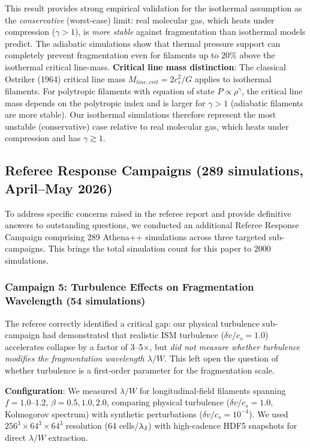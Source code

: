 \documentclass[twoside,twocolumn]{mnras}
\begin{document}
This result provides strong empirical validation for the isothermal assumption as the {\it conservative} (worst-case) limit: real molecular gas, which heats under compression ($\gamma > 1$), is {\it more stable} against fragmentation than isothermal models predict. The adiabatic simulations show that thermal pressure support can completely prevent fragmentation even for filaments up to $20\%$ above the isothermal critical line-mass. \textbf{Critical line mass distinction}: The classical Ostriker (1964) critical line mass $M_{line,crit} = 2c_s^2/G$ applies to isothermal filaments. For polytropic filaments with equation of state $P \propto \rho^\gamma$, the critical line mass depends on the polytropic index and is larger for $\gamma > 1$ (adiabatic filaments are more stable). Our isothermal simulations therefore represent the most unstable (conservative) case relative to real molecular gas, which heats under compression and has $\gamma \gtrsim 1$.

\subsection{Referee Response Campaigns (289 simulations, April--May 2026)}
\label{sec:referee_response}

To address specific concerns raised in the referee report and provide definitive answers to outstanding questions, we conducted an additional Referee Response Campaign comprising 289 Athena++ simulations across three targeted sub-campaigns. This brings the total simulation count for this paper to 2000 simulations.

\subsubsection{Campaign 5: Turbulence Effects on Fragmentation Wavelength (54 simulations)}

The referee correctly identified a critical gap: our physical turbulence sub-campaign had demonstrated that realistic ISM turbulence ($\delta v/c_s = 1.0$) accelerates collapse by a factor of 3--5$\times$, but \textit{did not measure whether turbulence modifies the fragmentation wavelength $\lambda/W$}. This left open the question of whether turbulence is a first-order parameter for the fragmentation scale.

\textbf{Configuration}: We measured $\lambda/W$ for longitudinal-field filaments spanning $f = 1.0$--$1.2$, $\beta = 0.5, 1.0, 2.0$, comparing physical turbulence ($\delta v/c_s = 1.0$, Kolmogorov spectrum) with synthetic perturbations ($\delta v/c_s = 10^{-4}$). We used $256^3 \times 64^3 \times 64^3$ resolution (64 cells/$\lambda_{\rm J}$) with high-cadence HDF5 snapshots for direct $\lambda/W$ extraction.
\end{document}
